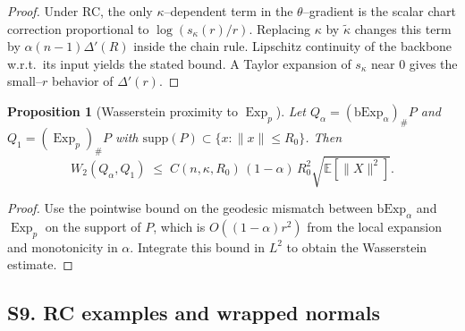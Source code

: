 \documentclass{article}
\newtheorem{proposition}{Proposition}
\theoremstyle{definition}
\theoremstyle{remark}
\newcommand{\Exp}{\operatorname{Exp}}
\begin{document}
\begin{proof}
Under RC, the only $\kappa$--dependent term in the $\theta$--gradient is the scalar chart correction
proportional to $\log(s_\kappa(r)/r)$. Replacing $\kappa$ by $\tilde\kappa$ changes this term by
$\alpha(n-1)\Delta'(R)$ inside the chain rule. Lipschitz continuity of the backbone w.r.t.\ its
input yields the stated bound. A Taylor expansion of $s_\kappa$ near $0$ gives the small--$r$
behavior of $\Delta'(r)$.
\end{proof}

\begin{proposition}[Wasserstein proximity to $\Exp_p$]
Let $Q_\alpha=(\mathrm{bExp}_\alpha)_\# P$ and $Q_1=(\Exp_p)_\# P$ with
$\mathrm{supp}(P)\subset\{x:\|x\|\le R_0\}$. Then
\[
W_2(Q_\alpha,Q_1)
\;\le\;
C(n,\kappa,R_0)\,(1-\alpha)\,R_0^2
\sqrt{\mathbb E[\|X\|^2]}.
\]
\end{proposition}

\begin{proof}
Use the pointwise bound on the geodesic mismatch between $\mathrm{bExp}_\alpha$ and $\Exp_p$ on
the support of $P$, which is $O((1-\alpha)r^2)$ from the local expansion and monotonicity in
$\alpha$. Integrate this bound in $L^2$ to obtain the Wasserstein estimate.
\end{proof}

\subsection*{S9. RC examples and wrapped normals}
\end{document}
